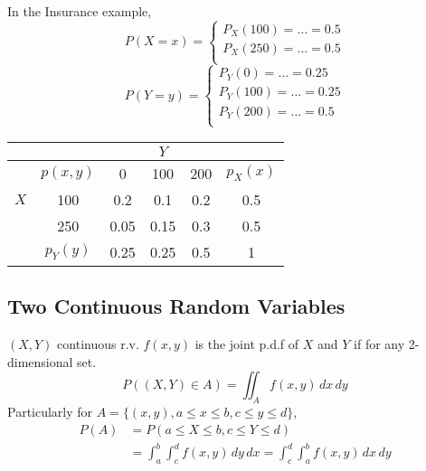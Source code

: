 \begin{exmp}
In the Insurance example,
\[P(X=x)=\begin{cases}
P_X(100)=\dots=0.5\\
P_X(250)=\dots=0.5\\
\end{cases}\]
\[P(Y=y)=\begin{cases}
P_Y(0)=\dots=0.25 \\
P_Y(100)=\dots=0.25\\
P_Y(200)=\dots=0.5\\
\end{cases}\]
\end{exmp}
\begin{center}
\begin{tabular}{c|c|ccc|c}
\hline
    &     &    & $Y$ &   & \\
\hline
    & $p(x,y)$ & 0    & 100  & 200 & $p_X(x)$  \\
$X$ & 100      & 0.2  & 0.1  & 0.2 & 0.5 \\
    & 250      & 0.05 & 0.15 & 0.3 & 0.5 \\
    \hline
    & $p_Y(y)$ & 0.25 & 0.25 & 0.5 & 1 \\
\hline
\end{tabular}
\end{center}

\subsection{Two Continuous Random Variables}
$(X,Y)$ continuous r.v. $f(x,y)$ is the joint p.d.f of $X$ and $Y$ if for any 2-dimensional set.
\[P((X,Y)\in A)=\iint_{A} f(x,y)\,dx \,dy\]
Particularly for $A =\{(x,y),a \leq x\leq b,c \leq y \leq d\}$,
\begin{align*}
P(A)&=P(a\leq X \leq b,c  \leq Y \leq d)\\
&= \int_{a}^b \int_c^d f(x,y) \,dy \,dx=\int_c^d \int_{a}^b f(x,y) \,dx \,dy
\end{align*}

